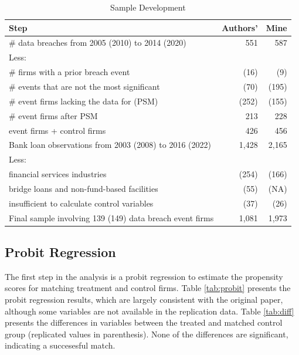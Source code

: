 \documentclass[11pt]{article}
\begin{document}
\begin{table}[ht]
  \centering
  \scriptsize
  \begin{tabular}{@{}lrr@{}}
    \toprule
    \textbf{Step}                                            & \textbf{Authors'} & \textbf{Mine} \\ \midrule
    \# data breaches from 2005 (2010) to 2014 (2020)         & 551               & 587           \\
    Less:                                                    &                   &               \\
    \quad \# firms with a prior breach event                 & (16)              & (9)           \\
    \quad \# events that are not the most significant        & (70)              & (195)         \\
    \quad \# event firms lacking the data for (PSM)          & (252)             & (155)         \\
    \# event firms after PSM                                 & 213               & 228           \\
    event firms + control firms                              & 426               & 456           \\
    Bank loan observations from 2003 (2008) to 2016 (2022)   & 1,428             & 2,165         \\
    Less:                                                    &                   &               \\
    \quad financial services industries                      & (254)             & (166)         \\
    \quad bridge loans and non-fund-based facilities         & (55)              & (NA)          \\
    \quad insufficient to calculate control variables        & (37)              & (26)          \\
    Final sample involving 139 (149) data breach event firms & 1,081             & 1,973         \\ \bottomrule
  \end{tabular}
  \caption{Sample Development}
  \label{tab:sample}
\end{table}

\subsection{Probit Regression}
The first step in the analysis is a probit regression to estimate the propensity scores for matching treatment and control firms. Table \ref{tab:probit} presents the probit regression results, which are largely consistent with the original paper, although some variables are not available in the replication data. Table \ref{tab:diff} presents the differences in variables between the treated and matched control group (replicated values in parenthesis). None of the differences are significant, indicating a succesesful match.
\end{document}
